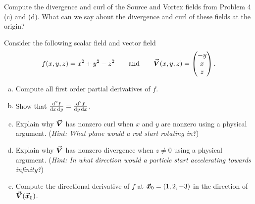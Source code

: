 \documentclass[12pt]{article} %
\begin{document}
\begin{problem}
Compute the divergence and curl of the Source and Vortex fields from Problem 4 (c) and (d).  What can we say about the divergence and curl of these fields at the origin?
\end{problem}

\begin{problem}
Consider the following scalar field and vector field
\[
f(x,y,z) = x^2+y^2-z^2 \qquad \textrm{and} \qquad \boldsymbol{\vec{V}}(x,y,z) = \begin{pmatrix} -y \\ x \\ z \end{pmatrix}.
\]
\begin{enumerate}[(a)]
    \item Compute all first order partial derivatives of $f$.
    \item Show that $\frac{\mathop{}\!\mathrm{d}^2 f}{\mathop{}\!\mathrm{d} x \mathop{}\!\mathrm{d} y} = \frac{\mathop{}\!\mathrm{d}^2 f}{\mathop{}\!\mathrm{d} y \mathop{}\!\mathrm{d} x}$.
    \item Explain why $\boldsymbol{\vec{V}}$ has nonzero curl when $x$ and $y$ are nonzero using a physical argument. (\emph{Hint: What plane would a rod start rotating in?})
    \item Explain why $\boldsymbol{\vec{V}}$ has nonzero divergence when $z\neq 0$ using a physical argument. (\emph{Hint: In what direction would a particle start accelerating towards infinity?})
    \item Compute the directional derivative of $f$ at $\boldsymbol{\vec{x}}_0 = (1,2,-3)$ in the direction of $\boldsymbol{\vec{V}}(\boldsymbol{\vec{x}}_0)$.
\end{enumerate}
\end{problem}
\end{document}
